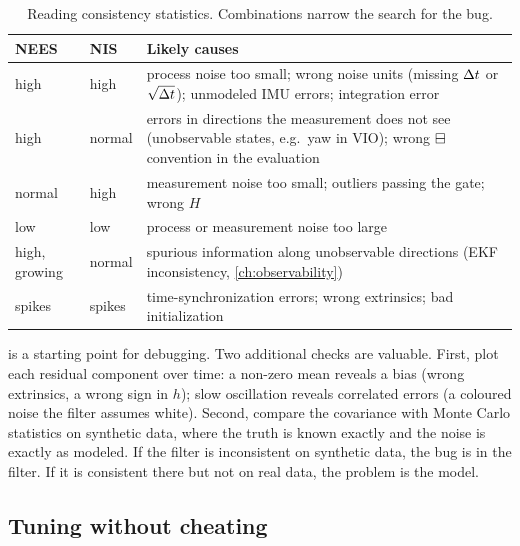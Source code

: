 \begin{table}[t]
\centering\small
\begin{tabularx}{\textwidth}{@{}l l X@{}}
\toprule
\textbf{NEES} & \textbf{NIS} & \textbf{Likely causes} \\
\midrule
high & high & process noise too small; wrong noise units (missing ${\Delta t}$ or $\sqrt{{\Delta t}}$); unmodeled IMU errors; integration error \\
high & normal & errors in directions the measurement does not see (unobservable states, e.g.\ yaw in VIO); wrong $\boxminus$ convention in the evaluation \\
normal & high & measurement noise too small; outliers passing the gate; wrong $H$ \\
low & low & process or measurement noise too large \\
high, growing & normal & spurious information along unobservable directions (EKF inconsistency, \cref{ch:observability}) \\
spikes & spikes & time-synchronization errors; wrong extrinsics; bad initialization \\
\bottomrule
\end{tabularx}
\caption{Reading consistency statistics. Combinations narrow the search for the bug.}
\label{tab:consistency-diagnosis}
\end{table}

 is a starting point for debugging. Two additional checks are valuable. First, plot each
residual component over time: a non-zero mean reveals a bias (wrong extrinsics, a wrong sign in $h$); slow oscillation
reveals correlated errors (a coloured noise the filter assumes white). Second, compare the covariance with Monte
Carlo statistics on synthetic data, where the truth is known exactly and the noise is exactly as modeled. If the filter
is inconsistent on synthetic data, the bug is in the filter. If it is consistent there but not on real data, the problem is
the model.

\subsection{Tuning without cheating}

